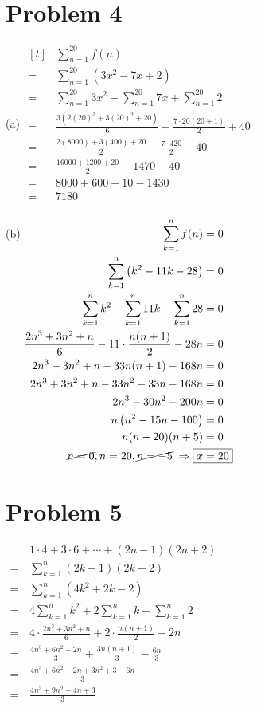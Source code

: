 \documentclass{article}
\begin{document}
\section*{Problem 4}
\begin{itemize}
\begin{minipage}[t]{0.52\linewidth}
\item[(a)]
$\begin{aligned}[t]
	&\sum_{n=1}^{20}f(n) \\
	=\,&\sum_{n=1}^{20}\left(3x^2-7x+2\right) \\
	=\,&\sum_{n=1}^{20}3x^2-\sum_{n=1}^{20}7x+\sum_{n=1}^{20}2 \\
	=\,&\frac{3\left(2(20)^3+3(20)^2+20\right)}{6}-\frac{7\cdot20(20+1)}{2}+40 \\
	=\,&\frac{2(8000)+3(400)+20}{2}-\frac{7\cdot420}{2}+40 \\
	=\,&\frac{16000+1200+20}{2}-1470+40 \\
	=\,&8000+600+10-1430 \\
	=\,&\boxed{7180} \\
\end{aligned}$
\end{minipage}
\begin{minipage}[t]{0.47\linewidth}
\item[(b)]
$\begin{aligned}[t]
	\sum_{k=1}^{n}f(n)&=0 \\
	\sum_{k=1}^{n}\left(k^2-11k-28\right)&=0 \\
	\sum_{k=1}^{n}k^2-\sum_{k=1}^{n}11k-\sum_{k=1}^{n}28&=0 \\
	\frac{2n^3+3n^2+n}{6}-11\cdot\frac{n(n+1)}{2}-28n&=0 \\
	2n^3+3n^2+n-33n(n+1)-168n&=0 \\
	2n^3+3n^2+n-33n^2-33n-168n&=0 \\
	2n^3-30n^2-200n&=0 \\
	n\left(n^2-15n-100\right)&=0 \\
	n(n-20)(n+5)&=0 \\
\cancel{n=0}, n=20, \cancel{n=-5}\;\Rightarrow\;\Aboxed{x&=20}
\end{aligned}$
\end{minipage}
\end{itemize}

\section*{Problem 5}
$\begin{aligned}
	&1\cdot4+3\cdot6+\cdots+(2n-1)(2n+2) \\
	=\,&\sum_{k=1}^{n}(2k-1)(2k+2) \\
	=\,&\sum_{k=1}^{n}\left(4k^2+2k-2\right) \\
	=\,&4\sum_{k=1}^{n}k^2+2\sum_{k=1}^{n}k-\sum_{k=1}^{n}2 \\
	=\,&4\cdot\frac{2n^3+3n^2+n}{6}+2\cdot\frac{n(n+1)}{2}-2n \\
	=\,&\frac{4n^3+6n^2+2n}{3}+\frac{3n(n+1)}{3}-\frac{6n}{3} \\
	=\,&\frac{4n^3+6n^2+2n+3n^2+3-6n}{3} \\
	=\,&\boxed{\frac{4n^3+9n^2-4n+3}{3}} \\
\end{aligned}$
\end{document}
